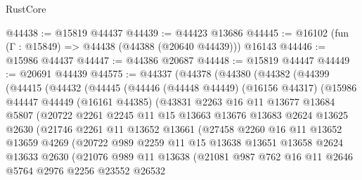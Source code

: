 \begin{lexlean}{RustCore}
\begin{coremodule}
@44438 := @15819 @44437
@44439 := @44423 @13686
@44445 := @16102 (fun (Γ : @15849) => @44438 (@44388 (@20640 @44439))) @16143
@44446 := @15986 @44437
@44447 := @44386 @20687
@44448 := @15819 @44447
@44449 := @20691 @44439
@44575 := @44337
    (@44378
      (@44380
        (@44382
          (@44399
            (@44415
              (@44432
                (@44445
                  (@44446
                    (@44448 @44449)
                    (@16156 @44317)
                    (@15986
                      @44447
                      @44449
                      (@16161 @44385)
                      (@43831
                        @2263
                        @16
                        @11
                        @13677
                        @13684
                        @5807
                        (@20722
                          @2261
                          @2245
                          @11
                          @15
                          @13663
                          @13676
                          @13683
                          @2624
                          @13625
                          @2630
                          (@21746
                            @2261
                            @11
                            @13652
                            @13661
                            (@27458
                              @2260
                              @16
                              @11
                              @13652
                              @13659
                              @4269
                              (@20722
                                @989
                                @2259
                                @11
                                @15
                                @13638
                                @13651
                                @13658
                                @2624
                                @13633
                                @2630
                                (@21076
                                  @989
                                  @11
                                  @13638
                                  (@21081
                                    @987
                                    @762
                                    @16
                                    @11
                                    @2646
                                    @5764
                                    @2976
                                    @2256
                                    @23552
                                    @26532

\end{coremodule}
\end{lexlean}
